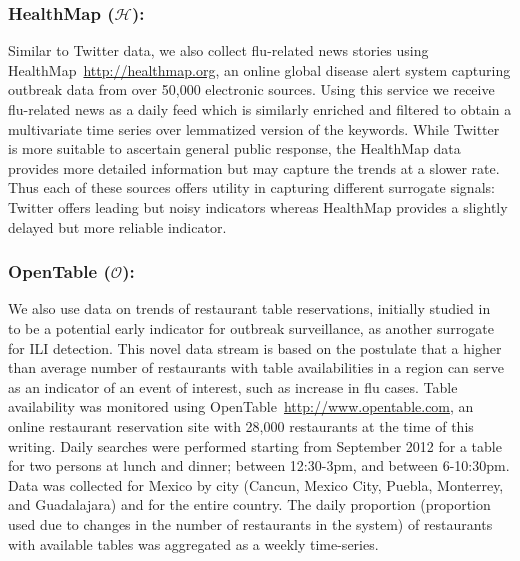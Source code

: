 \subsubsection{HealthMap ($\mathcal{H}$):} 
Similar to Twitter data, we also collect flu-related
news stories using HealthMap~\url{http://healthmap.org}, an online global disease alert
system capturing outbreak data from over 50,000 electronic sources.
Using this service we receive flu-related news as a daily feed
which is similarly enriched and filtered to obtain
a multivariate time series over lemmatized version of the keywords. 
While Twitter is more suitable to ascertain general public response, the
HealthMap data provides more detailed information but may capture the trends
at a slower rate. Thus each of these sources offers utility in
capturing different surrogate signals: Twitter offers leading but noisy
indicators whereas HealthMap provides a slightly delayed but more reliable
indicator.

\subsubsection{OpenTable ($\mathcal{O}$):}
We also use data on trends of restaurant table reservations, initially 
studied in~\cite{elaine2013opentable} to be a potential early indicator for
outbreak surveillance, as another surrogate for ILI detection.
This novel data stream is based on the
postulate that a higher than average number of restaurants with table
availabilities in a region can serve as an indicator of an event of interest,
such as increase in flu cases. Table availability was monitored using 
OpenTable~\url{http://www.opentable.com}, 
an online restaurant reservation site with 28,000 restaurants at the time
of this writing. Daily searches were performed starting from September 2012 for
a table for two persons at lunch and dinner; between 12:30-3pm, and between
6-10:30pm. Data was collected for Mexico by city (Cancun, Mexico City, Puebla,
Monterrey, and Guadalajara) and for the entire country. The daily proportion
(proportion used due to changes in the number of restaurants in the system) of
restaurants with available tables was aggregated as a weekly time-series.

